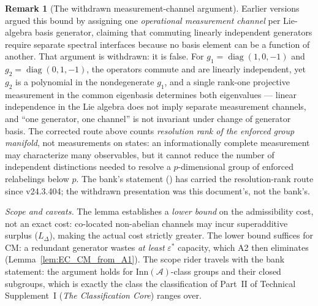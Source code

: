 \documentclass[11pt]{article}
\theoremstyle{definition}
\newtheorem{remark}[theorem]{Remark}
\newcommand{\codeid}[1]{\texttt{\seqsplit{#1}}}%
\newcommand{\TSI}{Technical Supplement~I (\emph{The Classification Core})}
\begin{document}
\begin{remark}[The withdrawn measurement-channel argument]
\label{rem:withdrawn_channel_argument}
Earlier versions argued this bound by assigning one \emph{operational
measurement channel} per Lie-algebra basis generator, claiming that
commuting linearly independent generators require separate spectral
interfaces because no basis element can be a function of another.
That argument is withdrawn: it is false.  For
$g_1 = \operatorname{diag}(1, 0, -1)$ and
$g_2 = \operatorname{diag}(0, 1, -1)$, the operators commute and are
linearly independent, yet $g_2$ is a polynomial in the nondegenerate
$g_1$, and a single rank-one projective measurement in the common
eigenbasis determines both eigenvalues --- linear independence in the
Lie algebra does not imply separate measurement channels, and
``one generator, one channel'' is not invariant under change of
generator basis.  The corrected route above counts \emph{resolution
rank of the enforced group manifold}, not measurements on states: an
informationally complete measurement may characterize many
observables, but it cannot reduce the number of independent
distinctions needed to resolve a $p$-dimensional group of enforced
relabelings below $p$.  The bank's statement
(\codeid{check\_L\_cost\_gauge}) has carried the resolution-rank route
since v24.3.404; the withdrawn presentation was this document's, not
the bank's.
\end{remark}

\smallskip\noindent\textit{Scope and caveats.}\quad
The lemma establishes a \emph{lower bound} on the admissibility cost,
not an exact cost: co-located non-abelian channels may incur
superadditive surplus ($L_\Delta$), making the actual cost strictly
greater.  The lower bound suffices for CM: a redundant generator
wastes \emph{at least} $\varepsilon^*$ capacity, which A2 then
eliminates (Lemma~\ref{lem:EC_CM_from_A1}).  The scope rider travels
with the bank statement: the argument holds for
$\mathrm{Inn}(\mathcal{A})$-class groups and their closed subgroups,
which is exactly the class the classification of
Part~II of \TSI{} ranges over.
\end{document}
